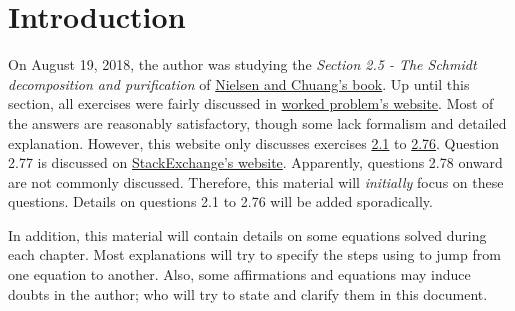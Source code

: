\section{Introduction}

On August 19, 2018, the author was studying the \emph{Section 2.5 - The Schmidt decomposition and purification} of \href{https://www.cambridge.org/core/books/quantum-computation-and-quantum-information/01E10196D0A682A6AEFFEA52D53BE9AE}{Nielsen and Chuang's book}. Up until this section, all exercises were fairly discussed in \href{https://workedproblems.wordpress.com/2010/06/06/nielsen-and-chuang-exercise-2-76/}{worked problem's website}. Most of the answers are reasonably satisfactory, though some lack formalism and detailed explanation. However, this website only discusses exercises \href{https://workedproblems.wordpress.com/2010/02/22/exercise-2-1/}{2.1} to \href{https://workedproblems.wordpress.com/2010/06/06/nielsen-and-chuang-exercise-2-76/}{2.76}. Question 2.77 is discussed on \href{https://physics.stackexchange.com/questions/183000/why-schmidt-decomposition-only-holds-for-two-component-composite-systems}{StackExchange's website}. Apparently, questions 2.78 onward are not commonly discussed. Therefore, this material will \emph{initially} focus on these questions. Details on questions 2.1 to 2.76 will be added sporadically.

In addition, this material will contain details on some equations solved during each chapter. Most explanations will try to specify the steps using to jump from one equation to another. Also, some affirmations and equations may induce doubts in the author; who will try to state and clarify them in this document.

\pagebreak